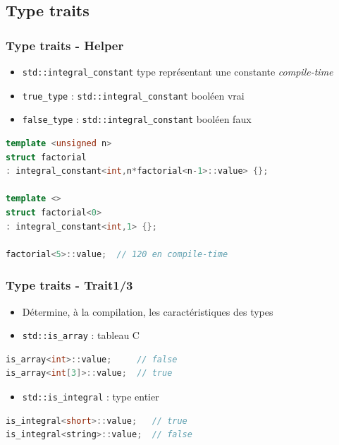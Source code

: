 \documentclass[C++.tex]{subfiles}
\begin{document}
\subsection*{Type traits}
\begin{frame}[fragile]
	\frametitle{Type traits - Helper}
	\begin{itemize}
		\item \lstinline|std::integral_constant| type représentant une constante \textit{compile-time}
		\item \lstinline|true_type| : \lstinline|std::integral_constant| booléen vrai
		\item \lstinline|false_type| : \lstinline|std::integral_constant| booléen faux
	\end{itemize}

	\begin{lstlisting}[language=C++]
template <unsigned n>
struct factorial 
: integral_constant<int,n*factorial<n-1>::value> {};

template <>
struct factorial<0> 
: integral_constant<int,1> {};

factorial<5>::value;  // 120 en compile-time\end{lstlisting}
\end{frame}

\begin{frame}[fragile]
	\frametitle{Type traits - Trait\titlehfill{}1/3}
	\begin{itemize}
		\item Détermine, à la compilation, les caractéristiques des types
		\item \lstinline|std::is_array| : tableau C
	\end{itemize}

	\begin{lstlisting}[language=C++]
is_array<int>::value;     // false
is_array<int[3]>::value;  // true\end{lstlisting}

	\begin{itemize}
		\item \lstinline|std::is_integral| : type entier
	\end{itemize}

	\begin{lstlisting}[language=C++]
is_integral<short>::value;   // true
is_integral<string>::value;  // false\end{lstlisting}
\end{frame}
\end{document}
